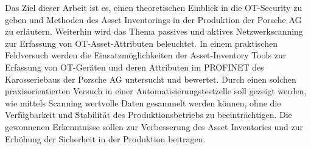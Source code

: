 Das Ziel dieser Arbeit ist es, einen theoretischen Einblick in die OT-Security zu geben und Methoden des Asset Inventorings in der Produktion der Porsche AG zu erläutern. Weiterhin wird das Thema passives und aktives Netzwerkscanning zur Erfassung von OT-Asset-Attributen beleuchtet. In einem praktischen Feldversuch werden die Einsatzmöglichkeiten der Asset-Inventory Tools zur Erfassung von OT-Geräten und deren Attributen im PROFINET des Karosseriebaus der Porsche AG untersucht und bewertet. Durch einen solchen praxisorientierten Versuch in einer Automatisierungstestzelle soll gezeigt werden, wie mittels Scanning wertvolle Daten gesammelt werden können, ohne die Verfügbarkeit und Stabilität des Produktionsbetriebs zu beeinträchtigen. Die gewonnenen Erkenntnisse sollen zur Verbesserung des Asset Inventories und zur Erhöhung der Sicherheit in der Produktion beitragen.

